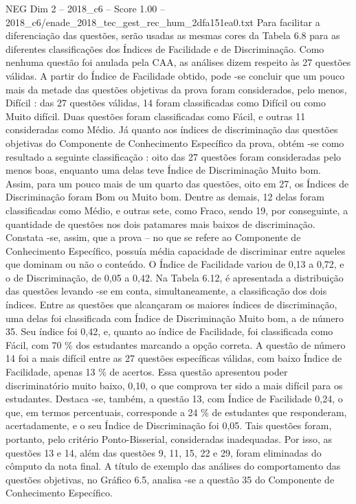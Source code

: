 \begin{textsample}{NEG Dim 2 – 2018\_c6 – Score 1.00 – 2018\_c6/enade\_2018\_tec\_gest\_rec\_hum\_2dfa151ea0.txt}
Para facilitar a diferenciação das questões, serão usadas as mesmas cores da Tabela 6.8 para as diferentes classificações dos Índices de Facilidade e de Discriminação.
Como nenhuma questão foi anulada pela CAA, as análises dizem respeito às 27 questões válidas.
A partir do Índice de Facilidade obtido, pode -se concluir que um pouco mais da metade das questões objetivas da prova foram considerados, pelo menos, Difícil : das 27 questões válidas, 14 foram classificadas como Difícil ou como Muito difícil.
Duas questões foram classificadas como Fácil, e outras 11 consideradas como Médio.
Já quanto aos índices de discriminação das questões objetivas do Componente de Conhecimento Específico da prova, obtém -se como resultado a seguinte classificação : oito das 27 questões foram consideradas pelo menos boas, enquanto uma delas teve Índice de Discriminação Muito bom.
Assim, para um pouco mais de um quarto das questões, oito em 27, os Índices de Discriminação foram Bom ou Muito bom.
Dentre as demais, 12 delas foram classificadas como Médio, e outras sete, como Fraco, sendo 19, por conseguinte, a quantidade de questões nos dois patamares mais baixos de discriminação.
Constata -se, assim, que a prova – no que se refere ao Componente de Conhecimento Específico, possuía média capacidade de discriminar entre aqueles que dominam ou não o conteúdo.
O Índice de Facilidade variou de 0,13 a 0,72, e o de Discriminação, de 0,05 a 0,42.
Na Tabela 6.12, é apresentada a distribuição das questões levando -se em conta, simultaneamente, a classificação dos dois índices.
Entre as questões que alcançaram os maiores índices de discriminação, uma delas foi classificada com Índice de Discriminação Muito bom, a de número 35.
Seu índice foi 0,42, e, quanto ao índice de Facilidade, foi classificada como Fácil, com 70 \% dos estudantes marcando a opção correta.
A questão de número 14 foi a mais difícil entre as 27 questões específicas válidas, com baixo Índice de Facilidade, apenas 13 \% de acertos.
Essa questão apresentou poder discriminatório muito baixo, 0,10, o que comprova ter sido a mais difícil para os estudantes.
Destaca -se, também, a questão 13, com Índice de Facilidade 0,24, o que, em termos percentuais, corresponde a 24 \% de estudantes que responderam, acertadamente, e o seu Índice de Discriminação foi 0,05.
Tais questões foram, portanto, pelo critério Ponto-Bisserial, consideradas inadequadas.
Por isso, as questões 13 e 14, além das questões 9, 11, 15, 22 e 29, foram eliminadas do cômputo da nota final.
A título de exemplo das análises do comportamento das questões objetivas, no Gráfico 6.5, analisa -se a questão 35 do Componente de Conhecimento Específico.

\end{textsample}
